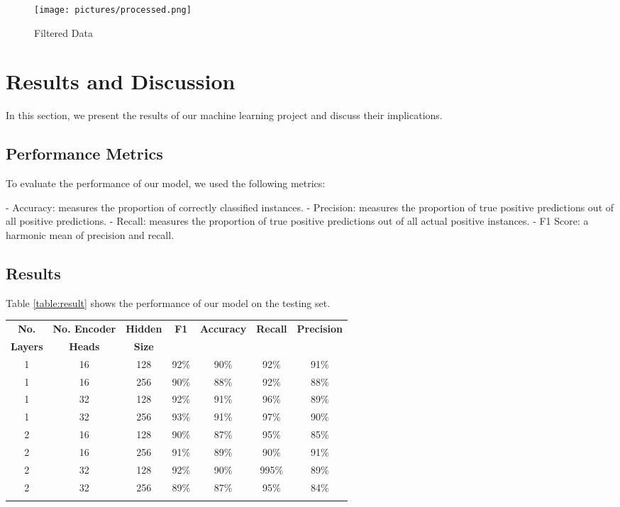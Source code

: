 \begin{figure}[htbp]
    \centering
    \texttt{[image: pictures/processed.png]}
    \caption{Filtered Data}
\end{figure}


\section{Results and Discussion}

In this section, we present the results of our machine learning project and discuss their implications.

\subsection{Performance Metrics}

To evaluate the performance of our model, we used the following metrics:

- Accuracy: measures the proportion of correctly classified instances.
- Precision: measures the proportion of true positive predictions out of all positive predictions.
- Recall: measures the proportion of true positive predictions out of all actual positive instances.
- F1 Score: a harmonic mean of precision and recall.

\subsection{Results}

Table \ref{table:result} shows the performance of our model on the testing set.



\begin{tabular}{c c c c c c c}
\toprule
\textbf{No.} & \textbf{No. Encoder} & \textbf{Hidden} & \textbf{F1} & \textbf{Accuracy} & \textbf{Recall} & \textbf{Precision} \\
\textbf{Layers} & \textbf{Heads} & \textbf{Size} &  &  &  &  \\ \midrule
1 & 16 & 128 & 92\% & 90\% & 92\% & 91\% \\
1 & 16 & 256 & 90\% & 88\% & 92\% & 88\% \\
1 & 32 & 128 & 92\% & 91\% & 96\% & 89\% \\
1 & 32 & 256  & 93\% & 91\% & 97\% & 90\% \\
2 & 16 & 128 & 90\% & 87\% & 95\% & 85\% \\
2 & 16 & 256 & 91\% & 89\% & 90\% & 91\% \\
2 & 32 & 128 & 92\% & 90\% & 995\% & 89\% \\
2 & 32 & 256 & 89\% & 87\% & 95\% & 84\% \\
\bottomrule
\label{table:result}
\end{tabular}


